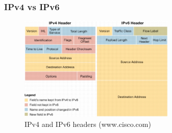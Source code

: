   \begin{frame}
    \frametitle{IPv4 vs IPv6}
    \begin{figure}[t]
      \centering
      \includegraphics[height=5cm]{./imgs/ipv4-6_header.jpg}
      \caption{IPv4 and IPv6 headers (www.cisco.com)}
      \label{fig:ipv4-ipv6_header}
    \end{figure}
  \end{frame}

